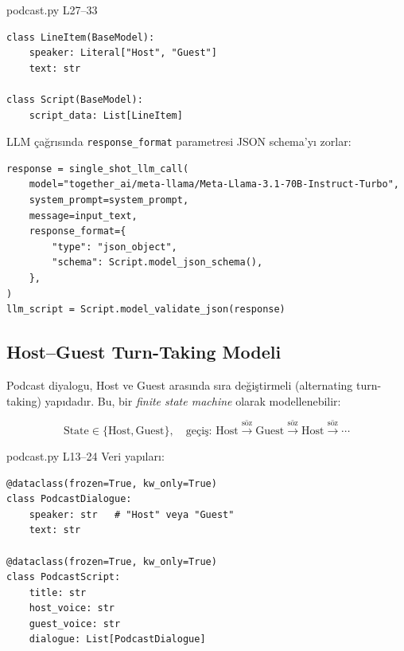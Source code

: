 \begin{kodref}{podcast.py L27--33}
\begin{lstlisting}[caption={Script Pydantic modelleri}]
class LineItem(BaseModel):
    speaker: Literal["Host", "Guest"]
    text: str

class Script(BaseModel):
    script_data: List[LineItem]
\end{lstlisting}
\end{kodref}

LLM \c{c}a\u{g}r{\i}s{\i}nda \texttt{response\_format} parametresi JSON schema'y{\i} zorlar:

\begin{lstlisting}[caption={Structured output zorlamas{\i}}]
response = single_shot_llm_call(
    model="together_ai/meta-llama/Meta-Llama-3.1-70B-Instruct-Turbo",
    system_prompt=system_prompt,
    message=input_text,
    response_format={
        "type": "json_object",
        "schema": Script.model_json_schema(),
    },
)
llm_script = Script.model_validate_json(response)
\end{lstlisting}

\subsection{Host--Guest Turn-Taking Modeli}

Podcast diyalogu, Host ve Guest aras{\i}nda s{\i}ra de\u{g}i\c{s}tirmeli (alternating turn-taking) yap{\i}dad{\i}r. Bu, bir \emph{finite state machine} olarak modellenebilir:

\begin{equation}
\label{eq:turn_taking}
\text{State} \in \{\text{Host}, \text{Guest}\}, \quad \text{ge\c{c}i\c{s}: Host} \xrightarrow{\text{s\"{o}z}} \text{Guest} \xrightarrow{\text{s\"{o}z}} \text{Host} \xrightarrow{\text{s\"{o}z}} \cdots
\end{equation}

\begin{kodref}{podcast.py L13--24}
Veri yap{\i}lar{\i}:
\begin{lstlisting}[caption={Podcast veri yap{\i}lar{\i}}]
@dataclass(frozen=True, kw_only=True)
class PodcastDialogue:
    speaker: str   # "Host" veya "Guest"
    text: str

@dataclass(frozen=True, kw_only=True)
class PodcastScript:
    title: str
    host_voice: str
    guest_voice: str
    dialogue: List[PodcastDialogue]
\end{lstlisting}
\end{kodref}

